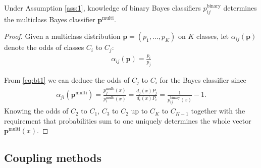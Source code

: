 \begin{prop}
	 \label{prop:binary2multi}
	 Under Assumption \ref{ass:1}, knowledge of binary Bayes classifiers $p^\textrm{binary}_{ij}$ determines the multiclass Bayes classifier 
	 $\boldsymbol{p}^\textrm{multi}$.
\end{prop}
\begin{proof}
	Given a multiclass distribution $\boldsymbol{p} = (p_1, \ldots,p_K)$ on $K$ classes, let $\alpha_{ij}(\boldsymbol{p})$ denote the odds of classes $C_i$ to $C_j$:
	\begin{align}
		\alpha_{ij}(\boldsymbol{p}) = \frac{p_i}{p_j} \label{eq:alpha}
	\end{align}
	
	From \eqref{eq:bt1} we can deduce the odds of  $C_j$ to $C_i$ for the Bayes classifier since
	\begin{align}
	\alpha_{ji}(\boldsymbol{p}^\textrm{multi}) = \frac{p_j^\textrm{multi}(x)}{p_i^\textrm{multi}(x)}
	=  \frac{d_j(x) P_j}{d_i(x) P_i} = \frac{1}{p^\textrm{binary}_{ij}(x)}- 1.
	\end{align}
	Knowing the odds of $C_2$ to $C_1$, $C_3$ to $C_2$ up to $C_{K}$ to $C_{K-1}$ together with the requirement that probabilities sum to one uniquely determines the whole vector $\boldsymbol{p}^\textrm{multi}(x)$.
\end{proof}


\subsection{Coupling methods}

